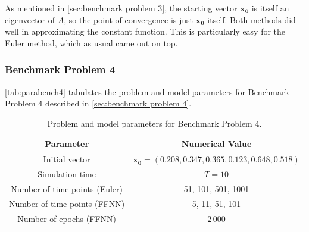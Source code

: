As mentioned in \autoref{sec:benchmark problem 3}, the starting vector $\bm{x_0}$ is itself an eigenvector of $A$, so the point of convergence is just $\bm{x_0}$ itself. Both methods did well in approximating the constant function. This is particularly easy for the Euler method, which as usual came out on top.

\subsubsection{Benchmark Problem 4}

\autoref{tab:parabench4} tabulates the problem and model parameters for Benchmark Problem 4 described in \autoref{sec:benchmark problem 4}. 

\begin{table}[H]
\caption{Problem and model parameters for Benchmark Problem 4.}
\centering
{}
\begin{tabular}{c|c}
\hline
\hline 
Parameter & Numerical Value
\\
\hline 
\hline 
Initial vector & $\bm{x_0}=(0.208, 0.347, 0.365, 0.123, 0.648, 0.518)$
\\
Simulation time & $T=10$
\\
Number of time points (Euler) & 51, 101, 501, 1001
\\
Number of time points (FFNN) & 5, 11, 51, 101
\\
Number of epochs (FFNN) & $2\,000$
\\
\hline
\hline 
\end{tabular}
\label{tab:parabench4}
\end{table}


